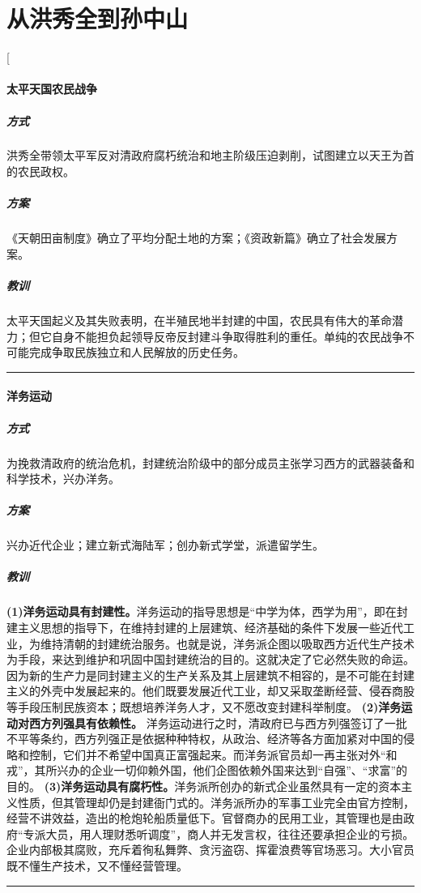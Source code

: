 
\section{从洪秀全到孙中山}
\begin{enumerate}
	\ans[
		\paragraph{太平天国农民战争}
			\subparagraph{方式} 洪秀全带领太平军反对清政府腐朽统治和地主阶级压迫剥削，试图建立以天王为首的农民政权。
			\subparagraph{方案} 《天朝田亩制度》确立了平均分配土地的方案；《资政新篇》确立了社会发展方案。
			\subparagraph{教训} 太平天国起义及其失败表明，在半殖民地半封建的中国，农民具有伟大的革命潜力；但它自身不能担负起领导反帝反封建斗争取得胜利的重任。单纯的农民战争不可能完成争取民族独立和人民解放的历史任务。
		\bigskip
		\hrule
		\bigskip
		\paragraph{洋务运动}
			\subparagraph{方式} 为挽救清政府的统治危机，封建统治阶级中的部分成员主张学习西方的武器装备和科学技术，兴办洋务。
			\subparagraph{方案}  兴办近代企业；建立新式海陆军；创办新式学堂，派遣留学生。
			\subparagraph{教训}{
				\textbf{(1)洋务运动具有封建性。}洋务运动的指导思想是“中学为体，西学为用”，即在封建主义思想的指导下，在维持封建的上层建筑、经济基础的条件下发展一些近代工业，为维持清朝的封建统治服务。也就是说，洋务派企图以吸取西方近代生产技术为手段，来达到维护和巩固中国封建统治的目的。这就决定了它必然失败的命运。因为新的生产力是同封建主义的生产关系及其上层建筑不相容的，是不可能在封建主义的外壳中发展起来的。他们既要发展近代工业，却又采取垄断经营、侵吞商股等手段压制民族资本；既想培养洋务人才，又不愿改变封建科举制度。
				\textbf{(2)洋务运动对西方列强具有依赖性。} 洋务运动进行之时，清政府已与西方列强签订了一批不平等条约，西方列强正是依据种种特权，从政治、经济等各方面加紧对中国的侵略和控制，它们并不希望中国真正富强起来。而洋务派官员却一再主张对外“和戎”，其所兴办的企业一切仰赖外国，他们企图依赖外国来达到“自强”、“求富”的目的。
				\textbf{(3)洋务运动具有腐朽性。}洋务派所创办的新式企业虽然具有一定的资本主义性质，但其管理却仍是封建衙门式的。洋务派所办的军事工业完全由官方控制，经营不讲效益，造出的枪炮轮船质量低下。官督商办的民用工业，其管理也是由政府“专派大员，用人理财悉听调度”，商人并无发言权，往往还要承担企业的亏损。企业内部极其腐败，充斥着徇私舞弊、贪污盗窃、挥霍浪费等官场恶习。大小官员既不懂生产技术，又不懂经营管理。
			}
		\bigskip
		\hrule
		\bigskip

\end{enumerate}
